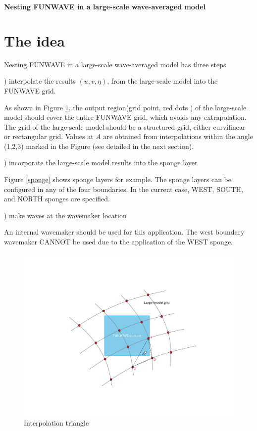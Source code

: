 \documentclass[preprint,10pt]{elsarticle}
\begin{document}

\begin{center}
{\bf \Large Nesting FUNWAVE in a large-scale wave-averaged model}
 \end{center}
 
 \section{The idea }
 
 Nesting FUNWAVE in a large-scale wave-averaged model has three steps
 
 ) interpolate the results $(u,v,\eta)$, from the large-scale model into the FUNWAVE grid. 
 
 As shown in Figure \ref{two_grid}, the output region(grid point, red dots ) of the large-scale model should cover the entire FUNWAVE grid, which avoids any extrapolation. The grid of the large-scale model should be a structured grid, either curvilinear or rectangular grid. Values at $A$ are obtained from interpolations within the angle (1,2,3) marked in the Figure (see detailed in the next section). 
 
 ) incorporate the large-scale model results into the sponge layer
 
 Figure \ref{sponge} shows sponge layers for example. The sponge layers can be configured in any of the four boundaries. In the current case, WEST, SOUTH, and NORTH sponges are specified. 
 
 ) make waves at the wavemaker location
 
 An internal wavemaker should be used for this application. The west boundary wavemaker CANNOT be used due to the application of the WEST sponge. 
 
  \begin{figure}
\begin{center}
 \includegraphics[width=1.0\textwidth]{figures/two_grids.pdf}
 \caption{Interpolation triangle }
 \label{two_grid}
 \end{center}
 \end{figure}
 
\end{document}
